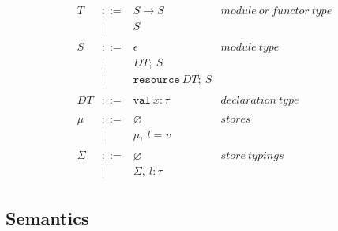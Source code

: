 \documentclass{llncs}
\newcommand{\keyw}[1]{\mathtt{#1}~}
\begin{document}
\[\begin{array}{lll}
\begin{array}{lllr}
T & ::= & S \rightarrow S & module~or~functor~type\\
& | & S \\
&&\\
S & ::= & \epsilon & module~type \\
& | & DT;~S \\
& | & \keyw{resource} DT;~S \\
&&\\
DT & ::= & \keyw{val} x : \tau & declaration~type\\
&&\\
\mu & ::= & \varnothing & stores\\
& | & \mu,~l = v\\
&&\\
\Sigma & ::= & \varnothing & store~typings\\
& | & \Sigma,~l : \tau
\end{array}
\end{array}
\]

\newpage

\subsection{Semantics}
\end{document}
